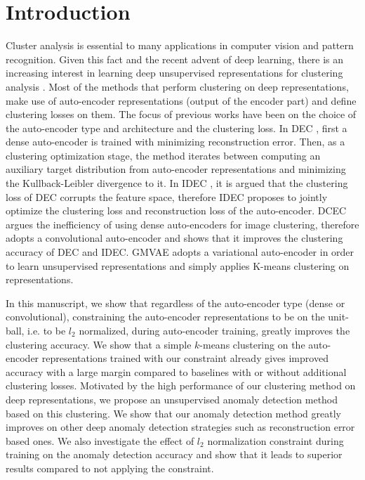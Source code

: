 \documentclass[conference]{IEEEtran}
\begin{document}
\section{Introduction}
Cluster analysis is essential to many applications in computer vision and pattern recognition. 
Given this fact and the recent advent of deep learning, there is an increasing interest in learning deep unsupervised representations for clustering analysis \cite{DEC,IDEC,GMVAE,DCEC}. 
Most of the methods that perform clustering on deep representations, make use of auto-encoder representations (output of the encoder part) and define clustering losses on them. 
The focus of previous works have been on the choice of the auto-encoder type and architecture and the clustering loss. 
In DEC \cite{DEC}, first a dense auto-encoder is trained with minimizing reconstruction error. 
Then, as a clustering optimization stage, the method iterates between computing an auxiliary target distribution from auto-encoder representations and minimizing the Kullback-Leibler divergence to it. 
In IDEC \cite{IDEC}, it is argued that the clustering loss of DEC corrupts the feature space, therefore IDEC proposes to jointly optimize the clustering loss and reconstruction loss of the auto-encoder. 
DCEC \cite{DCEC} argues the inefficiency of using dense auto-encoders for image clustering, therefore adopts a convolutional auto-encoder and shows that it improves the clustering accuracy of DEC and IDEC. 
GMVAE \cite{GMVAE} adopts a variational auto-encoder in order to learn unsupervised representations and simply applies K-means clustering on representations.

In this manuscript, we show that regardless of the auto-encoder type (dense or convolutional), constraining the auto-encoder representations to be on the unit-ball, i.e. to be $l_2$ normalized, during auto-encoder training, greatly improves the clustering accuracy. 
We show that a simple $k$-means clustering on the auto-encoder representations trained with our constraint already gives improved accuracy with a large margin compared to baselines with or without additional clustering losses.
Motivated by the high performance of our clustering method on deep representations, we propose an unsupervised anomaly detection method based on this clustering.
We show that our anomaly detection method greatly improves on other deep anomaly detection strategies such as reconstruction error based ones.
We also investigate the effect of $l_2$ normalization constraint during training on the anomaly detection accuracy and show that it leads to superior results compared to not applying the constraint.
\end{document}
